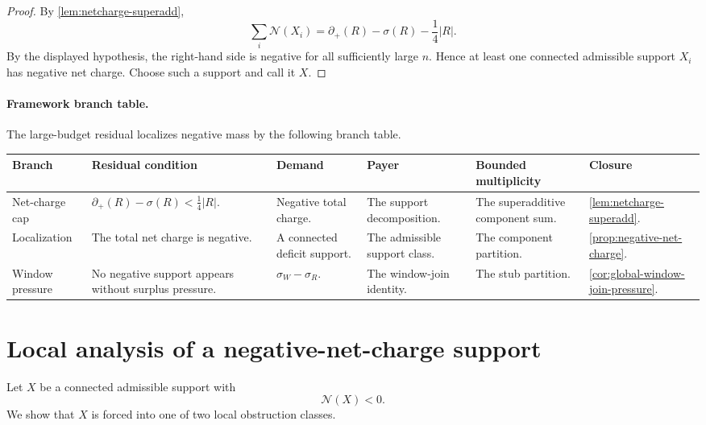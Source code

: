 \documentclass[11pt]{article}
\newcommand{\defp}{\partial_+}
\newcommand{\No}{\mathcal N}
\newcommand{\FrameworkBranchTableHeader}{%
\toprule
\textbf{Branch} & \textbf{Residual condition} & \textbf{Demand} & \textbf{Payer} & \textbf{Bounded multiplicity} & \textbf{Closure}\\
\midrule
}
\begin{document}
\begin{proof}
By \cref{lem:netcharge-superadd},
\[
\sum_i\No(X_i)=\defp(R)-\sigma(R)-\frac14|R|.
\]
By the displayed hypothesis, the right-hand side is negative for all
sufficiently large $n$.  Hence at least one connected admissible support $X_i$
has negative net charge.  Choose such a support and call it $X$.
\end{proof}

\paragraph{Framework branch table.}
The large-budget residual localizes negative mass by the following branch
table.
\begin{longtable}{L{0.13\textwidth} L{0.19\textwidth} L{0.14\textwidth} L{0.14\textwidth} L{0.17\textwidth} L{0.17\textwidth}}
\FrameworkBranchTableHeader
Net-charge cap
&
\(\defp(R)-\sigma(R)<\frac14|R|\).
&
Negative total charge.
&
The support decomposition.
&
The superadditive component sum.
&
\cref{lem:netcharge-superadd}.
\\
\addlinespace
Localization
&
The total net charge is negative.
&
A connected deficit support.
&
The admissible support class.
&
The component partition.
&
\cref{prop:negative-net-charge}.
\\
\addlinespace
Window pressure
&
No negative support appears without surplus pressure.
&
\(\sigma_W-\sigma_R\).
&
The window-join identity.
&
The stub partition.
&
\cref{cor:global-window-join-pressure}.
\\
\bottomrule
\end{longtable}

\section{Local analysis of a negative-net-charge support}\label{sec:local-analysis}

Let $X$ be a connected admissible support with
\[
\No(X)<0.
\]
We show that $X$ is forced into one of two local obstruction classes.
\end{document}
